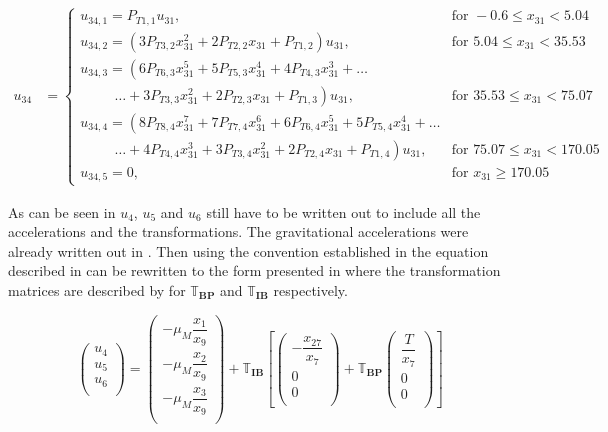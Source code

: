 \begin{equation}
\begin{split}
u_{34}&=\begin{cases}
u_{34,1}=P_{T 1,1}u_{31}, & \text{for } -0.6 \leq x_{31} < 5.04  \\
u_{34,2}=\left(3P_{T 3,2}x_{31}^{2}+2P_{T 2,2}x_{31}+P_{T 1,2}\right)u_{31}, &  \text{for } 5.04\leq x_{31} < 35.53   \\
u_{34,3}=\left(6 P_{T 6,3}x_{31}^{5}+5P_{T 5,3}x_{31}^{4}+4P_{T 4,3}x_{31}^{3}+\dots \right. \\
\qquad \ \  \left. \dotsc +3P_{T 3,3}x_{31}^{2}+2P_{T 2,3}x_{31}+P_{T 1,3}\right)u_{31}, &  \text{for } 35.53\leq x_{31} < 75.07   \\
u_{34,4}=\left(8 P_{T 8,4}x_{31}^{7}+7P_{T 7,4}x_{31}^{6}+6P_{T 6,4}x_{31}^{5}+5P_{T 5,4}x_{31}^{4} + \dots \right. \\
\qquad \ \  \left. \dotsc +4P_{T 4,4}x_{31}^{3}+3P_{T 3,4}x_{31}^{2}+2P_{T 2,4}x_{31}+P_{T 1,4}\right)u_{31}, &  \text{for } 75.07\leq x_{31} < 170.05   \\
u_{34,5}=0, &  \text{for }  x_{31} \geq 170.05   
\end{cases}
\end{split}
\end{equation}

As can be seen in  $u_{4}$, $u_{5}$ and $u_{6}$ still have to be written out to include all the accelerations and the transformations. The gravitational accelerations were already written out in . Then using the convention established in  the equation described in  can be rewritten to the form presented in  where the transformation matrices are described by  for $\mathbb{T}_{\mathbf{BP}}$ and $\mathbb{T}_{\mathbf{IB}}$ respectively.

\begin{equation} \label{eq:accAux}
\begin{pmatrix}
u_{4}\\
u_{5}\\
u_{6}\\
\end{pmatrix}
=
\begin{pmatrix}
-\mu_{M}\dfrac{x_{1}}{x_{9}}\\
-\mu_{M}\dfrac{x_{2}}{x_{9}}\\
-\mu_{M}\dfrac{x_{3}}{x_{9}}\\
\end{pmatrix}+
\mathbb{T}_{\mathbf{IB}}\left[
\begin{pmatrix}
-\dfrac{x_{27}}{x_{7}}\\
0\\
0\\
\end{pmatrix}
+ 
\mathbb{T}_{\mathbf{BP}}
\begin{pmatrix}
\dfrac{T}{x_{7}}\\
0\\
0\\
\end{pmatrix}
\right]
\end{equation}


